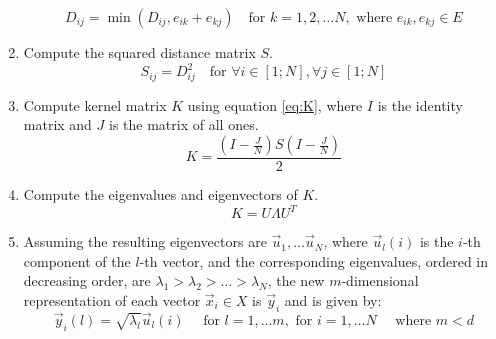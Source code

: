 \documentclass[a4paper, 11pt]{article}
\begin{document}
\begin{enumerate}
	\begin{equation}
	D_{ij} = \min(D_{ij}, e_{ik} + e_{kj}) \quad \text{for } 		k=1,2,\dots N, \text{ where } e_{ik}, e_{kj} \in E
	\end{equation}


	\item Compute the squared distance matrix $S$.
	\begin{equation}
	S_{ij} = D_{ij}^2 \quad \text{for }\forall i \in [1;N], \forall j \in [1;N]
	\end{equation}

	\item Compute kernel matrix $K$ using equation \ref{eq:K}, 		where $I$ is the identity matrix and $J$ is the matrix of 		all	ones.	
	\begin{equation} \label{eq:K}
	K = \frac{(I-\frac{J}{N})S(I-\frac{J}{N})}{2}  
	\end{equation}

	\item Compute the eigenvalues and eigenvectors of $K$.
	\begin{equation}
	K = U \Lambda U^T
	\end{equation}	
	
	\item Assuming the resulting eigenvectors are $\vec{u}_1, \dots \vec{u}_N$, where  $\vec{u}_{l}(i)$ is the $i$-th component of the $l$-th vector, and the corresponding eigenvalues, ordered in decreasing order, are $\lambda_1 > \lambda_2 > \dots >\lambda_N$, the new $m$-dimensional representation of each vector $\vec{x}_i \in X$ is $\vec{y}_i$ and is given by:
	\begin{equation}
	\vec{y}_{i}(l) =\sqrt{\lambda_l} \vec{u}_{l}(i) \quad \text{ for } l = 1, \dots m, \text{ for } i = 1, \dots N \quad \text{ where } m<d
	\end{equation}	

\end{enumerate}
\end{document}
